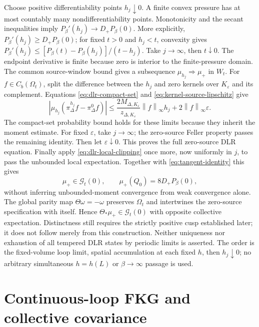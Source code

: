 \documentclass[11pt]{article}
\numberwithin{equation}{section}
\theoremstyle{definition}
\newcommand{\norm}[1]{\left\lVert#1\right\rVert}
\newcommand{\cG}{\mathcal G}
\begin{document}
Choose positive differentiability points $h_j\downarrow0$.  A finite convex
pressure has at most countably many nondifferentiability points.  Monotonicity
and the secant inequalities imply $P_\beta'(h_j)\to D_+P_\beta(0)$.
More explicitly, $P_\beta'(h_j)\geq D_+P_\beta(0)$; for fixed $t>0$
and $h_j<t$, convexity gives
$P_\beta'(h_j)\leq[P_\beta(t)-P_\beta(h_j)]/(t-h_j)$.
Take $j\to\infty$, then $t\downarrow0$.  The endpoint derivative is finite
because zero is interior to the finite-pressure domain.
The common source-window bound gives a subsequence
$\mu_{h_j}\Rightarrow\mu_+$ in $W_t$.
For $f\in C_b(\Omega_t)$, split the difference between the $h_j$ and
zero kernels over $K_\varepsilon$ and its complement.  Equations
\eqref{eq:dlr-compact-set} and \eqref{eq:kernel-source-lipschitz} give
\[
 |\mu_{h_j}(\pi_\Delta^{h_j}f-\pi_\Delta^0 f)|
 \leq\frac{2M_{\Delta,K_\varepsilon}}{z_{\Delta,K_\varepsilon}}
       \norm f_\infty h_j+2\norm f_\infty\varepsilon.
\]
The compact-set probability bound holds for these limits because they
inherit the moment estimate.  For fixed $\varepsilon$, take $j\to\infty$;
the zero-source Feller property passes the remaining identity.  Then let
$\varepsilon\downarrow0$.  This proves the full zero-source DLR equation.
Finally apply \eqref{eq:dlr-local-clipping} once more, now uniformly in
$j$, to pass the unbounded local expectation.  Together with
\eqref{eq:tangent-identity} this gives
\begin{equation}
 \mu_+\in\cG_t(0),\qquad
 \mu_+(Q_0)=8D_+P_\beta(0), \label{eq:source-zero-tangent}
\end{equation}
without inferring unbounded-moment convergence from weak convergence alone.
The global parity map $\Theta\omega=-\omega$ preserves $\Omega_t$ and
intertwines the zero-source specification with itself.  Hence
$\Theta_*\mu_+\in\cG_t(0)$ with opposite collective expectation.
Distinctness still requires the strictly positive cusp established later;
it does not follow merely from this construction.  Neither uniqueness nor
exhaustion of all tempered DLR states by periodic limits is asserted.  The
order is the fixed-volume loop limit, spatial accumulation at each fixed
$h$, then $h_j\downarrow0$; no arbitrary simultaneous $h=h(L)$ or
$\beta\to\infty$ passage is used.

\section{Continuous-loop FKG and collective covariance}
\label{sec:fkg}
\end{document}
